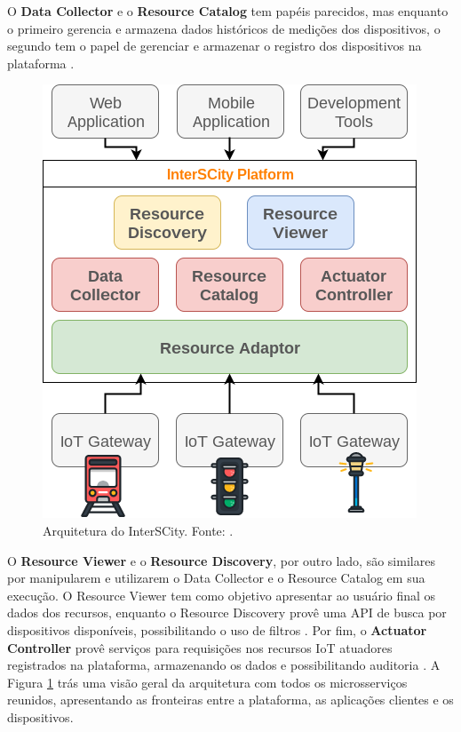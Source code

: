 O \textbf{Data Collector} e o \textbf{Resource Catalog} tem papéis parecidos,
mas enquanto o primeiro gerencia e armazena dados históricos de medições dos
dispositivos, o segundo tem o papel de gerenciar e armazenar o registro dos
dispositivos na plataforma \cite{delesposte2017}.

\begin{figure}[hbt]
  \centering
    \includegraphics[scale=0.5]{figuras/interscity_architecture.png}
    \caption{Arquitetura do InterSCity. Fonte: .}
  \label{fig:interscity-architecture}
\end{figure}


O \textbf{Resource Viewer} e o \textbf{Resource Discovery}, por outro lado,
são similares por manipularem e utilizarem o Data Collector e o Resource
Catalog em sua execução. O Resource Viewer tem como objetivo apresentar ao
usuário final os dados dos recursos, enquanto o Resource Discovery provê uma API
 de busca por dispositivos disponíveis, possibilitando o uso de filtros
\cite{delesposte2017}. Por fim, o \textbf{Actuator Controller} provê serviços
para requisições nos recursos IoT atuadores registrados na plataforma,
armazenando os dados e possibilitando auditoria \cite{delesposte2017}. A Figura
\ref{fig:interscity-architecture} trás uma visão geral da arquitetura com todos
os microsserviços reunidos, apresentando as fronteiras entre a plataforma,
as aplicações clientes e os dispositivos.


